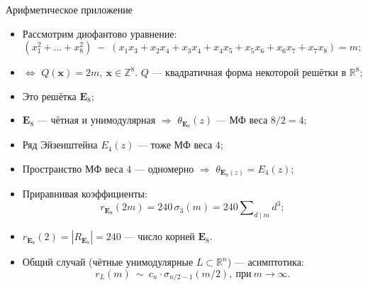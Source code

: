 \documentclass[serif, aspectratio=169]{beamer}
\begin{document}
\begin{frame}{Арифметическое приложение}
    \begin{itemize}
        \item Рассмотрим диофантово уравнение:
        \[(x_1^2+\dots+x_8^2) \;-\; \left(x_1x_3+x_2x_4+x_3x_4+x_4x_5+x_5x_6+x_6x_7+x_7x_8\right) = m;\]
        \item $\Leftrightarrow$ $Q(\mathbf{x})=2m,\ \mathbf{x}\in\mathbb{Z}^8$. $Q$ --- квадратичная форма некоторой решётки в $\mathbb{R}^8$;
        \item Это решётка $\mathbf{E}_8$;
        \item $\mathbf{E}_8$ --- чётная и унимодулярная $\Rightarrow$ $\theta_{\mathbf{E}_8}(z)$ --- МФ веса $8/2=4$;
        \item Ряд Эйзенштейна $E_4(z)$ --- тоже МФ веса $4$;
        \item Пространство МФ веса $4$ --- одномерно $\Rightarrow$ $\theta_{\mathbf{E}_8(z)} = E_4(z)$;
        \item Приравнивая коэффициенты:
        \[r_{\mathbf{E}_8}(2m) = 240\,\sigma_3(m) = 240 \sum\nolimits_{d\mid m} d^3;\]
        \item $r_{\mathbf{E}_8}(2) = |R_{\mathbf{E}_8}| = 240$ --- число корней $\mathbf{E}_8$.
        \item Общий случай (чётные унимодулярные $L\subset\mathbb{R}^n$) --- асимптотика:
        \[r_L(m)\ \sim\ c_n\cdot\sigma_{n/2-1}(m/2),\ \text{при}\ m\to\infty.\]
    \end{itemize}
\end{frame}
\end{document}
